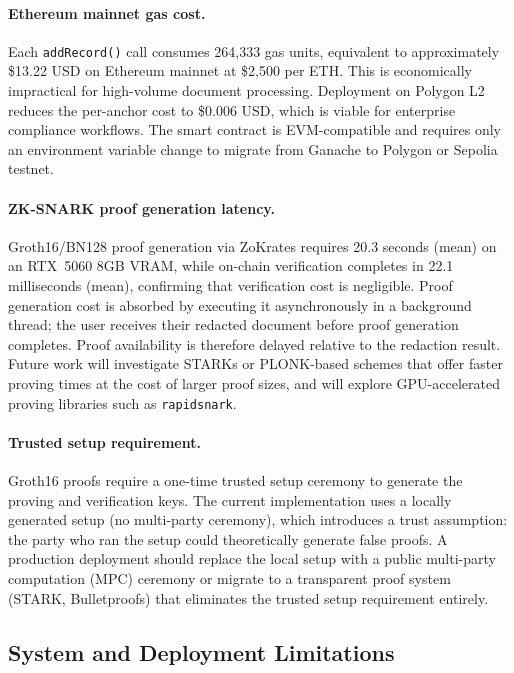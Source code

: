 \paragraph{Ethereum mainnet gas cost.}
Each \texttt{addRecord()} call consumes 264,333 gas
units, equivalent to approximately \$13.22 USD on
Ethereum mainnet at \$2,500 per ETH.
This is economically impractical for high-volume
document processing.
Deployment on Polygon L2 reduces the per-anchor cost
to \$0.006 USD, which is viable for enterprise
compliance workflows.
The smart contract is EVM-compatible and requires
only an environment variable change to migrate from
Ganache to Polygon or Sepolia testnet.
 
\paragraph{ZK-SNARK proof generation latency.}
Groth16/BN128 proof generation via ZoKrates requires
20.3 seconds (mean) on an RTX~5060 8GB VRAM, while
on-chain verification completes in 22.1 milliseconds
(mean), confirming that verification cost is negligible.
Proof generation cost is absorbed by executing it
asynchronously in a background thread; the user
receives their redacted document before proof
generation completes.
Proof availability is therefore delayed relative to
the redaction result.
Future work will investigate STARKs or PLONK-based
schemes that offer faster proving times at the cost
of larger proof sizes, and will explore GPU-accelerated
proving libraries such as \texttt{rapidsnark}.
 
\paragraph{Trusted setup requirement.}
Groth16 proofs require a one-time trusted setup
ceremony to generate the proving and verification keys.
The current implementation uses a locally generated
setup (no multi-party ceremony), which introduces a
trust assumption: the party who ran the setup could
theoretically generate false proofs.
A production deployment should replace the local setup
with a public multi-party computation (MPC) ceremony
or migrate to a transparent proof system (STARK,
Bulletproofs) that eliminates the trusted setup
requirement entirely.
 
\subsection{System and Deployment Limitations}
 
